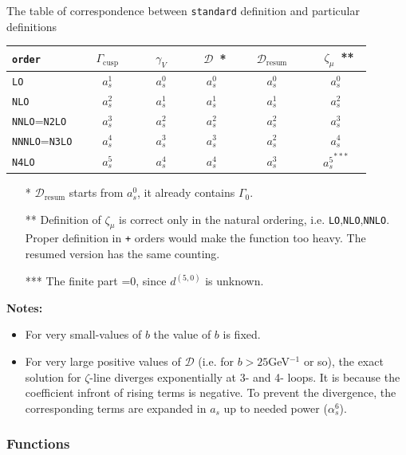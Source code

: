 \documentclass[prd,nofootinbib,eqsecnum,final]{revtex4}
\renewcommand{\(}{\left(}
\renewcommand{\)}{\right)}
\renewcommand{\[}{\left[}
\renewcommand{\]}{\right]}
\begin{document}
\begin{center}
The table of correspondence between \texttt{standard} definition and particular definitions
\begin{tabular}{|l||c|c|c||c|| c|}
\texttt{order}~~~ & ~~$\Gamma_{\text{cusp}}$~~ & ~~$\gamma_V$~~ & ~~$\mathcal{D}$~*~ & ~~$\mathcal{D}_{\text{resum}}$~~ & ~~$\zeta_\mu$~**~
\\\hline\hline
\texttt{LO} & $a_s^1$ & $a_s^0$ & $a_s^0$ & $a_s^0$ & $a_s^0$ 
\\\hline
\texttt{NLO} & $a_s^2$ & $a_s^1$ & $a_s^1$ & $a_s^1$ & $a_s^2$ 
\\\hline
\texttt{NNLO}=\texttt{N2LO} & $a_s^3$ & $a_s^2$ & $a_s^2$ & $a_s^2$ & $a_s^3$ 
\\\hline
\texttt{NNNLO}=\texttt{N3LO} & $a_s^4$ & $a_s^3$ & $a_s^3$ & $a_s^2$ & $a_s^4$ 
\\\hline
\texttt{N4LO} & $a_s^5$ & $a_s^4$ & $a_s^4$ & $a_s^3$ & ${a_s^5}^{***}$ 
\\\hline
\end{tabular}
\end{center}

\begin{itemize}
\item[*] $\mathcal{D}_{\text{resum}}$ starts from $a_s^0$, it already contains $\Gamma_0$.
\item[**] Definition of $\zeta_\mu$ is correct only in the natural ordering, i.e. \texttt{LO},\texttt{NLO},\texttt{NNLO}. Proper definition in \texttt{+} orders would make the function too heavy. The resumed version has the same counting.
\item[***] The finite part =0, since $d^{(5,0)}$ is unknown.
\end{itemize}

\textbf{Notes:}
\begin{itemize}
\item For very small-values of $b$ the value of $b$ is fixed.
\item For very large positive values of $\mathcal{D}$ (i.e. for $b>25$GeV$^{-1}$ or so), the exact solution for $\zeta$-line diverges exponentially at 3- and 4- loops. It is because the coefficient infront of rising terms is negative. To prevent the divergence, the corresponding terms are expanded in $a_s$ up to needed power ($\alpha_s^6$).
\end{itemize}

\subsubsection{Functions}
\end{document}
